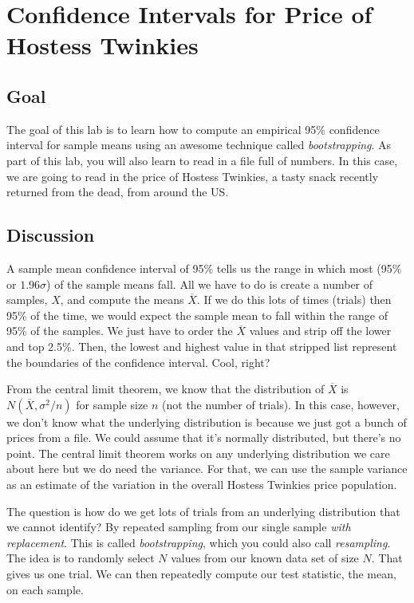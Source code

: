 \chapter{Confidence Intervals for Price of Hostess Twinkies}

\setcounter{problem}{1}
\section{Goal}

\begin{fullwidth}


The goal of this lab is to learn how to compute an empirical 95\% confidence interval for sample means using an awesome technique called {\em bootstrapping}. As part of this lab, you will also learn to read in a file full of numbers. In this case, we are going to read in the price of Hostess Twinkies, a tasty snack recently returned from the dead, from around the US.

\section{Discussion}

A sample mean confidence interval of 95\% tells us the range in which most (95\% or $1.96\sigma$) of the sample means fall.  All we have to do is create a number of samples, $X$, and compute the means $\overline{X}$.  If we do this lots of times (trials) then 95\% of the time, we would expect the sample mean to fall within the range of 95\% of the samples. We just have to order the $\overline{X}$ values and strip off the lower and top 2.5\%. Then, the lowest and highest value in that stripped list represent the boundaries of the confidence interval. Cool, right?

From the central limit theorem, we know that the distribution of $\overline{X}$ is $N(\overline{X}, \sigma^2/n)$ for sample size $n$ (not the number of trials). In this case, however, we don't know what the underlying distribution is because we just got a bunch of prices from a file. We could assume that it's normally distributed, but there's no point. The central limit theorem works on any underlying distribution we care about here but we do need the variance. For that, we can use the sample variance as an estimate of the variation in the overall Hostess Twinkies price population.

The question is how do we get lots of trials from an underlying distribution that we cannot identify? By repeated sampling from our single sample {\em with replacement}. This is called {\em bootstrapping}, which you could also call {\em resampling}. The idea is to randomly select $N$ values from our known data set of size $N$. That gives us one trial. We can then repeatedly compute our test statistic, the mean, on each sample.


\end{fullwidth}
